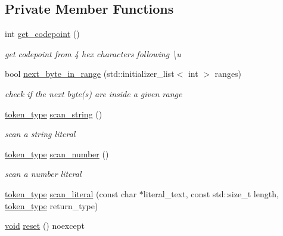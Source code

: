 \subsection*{Private Member Functions}
\begin{DoxyCompactItemize}
\item 
int \hyperlink{classnlohmann_1_1detail_1_1lexer_a820b20e25ff255c3c791c37f2bf48380}{get\+\_\+codepoint} ()
\begin{DoxyCompactList}\small\item\em get codepoint from 4 hex characters following {\ttfamily \textbackslash{}u} \end{DoxyCompactList}\item 
bool \hyperlink{classnlohmann_1_1detail_1_1lexer_a2faa544ab5475523ead81f9cdef41a0a}{next\+\_\+byte\+\_\+in\+\_\+range} (std\+::initializer\+\_\+list$<$ int $>$ ranges)
\begin{DoxyCompactList}\small\item\em check if the next byte(s) are inside a given range \end{DoxyCompactList}\item 
\hyperlink{classnlohmann_1_1detail_1_1lexer_a3f313cdbe187cababfc5e06f0b69b098}{token\+\_\+type} \hyperlink{classnlohmann_1_1detail_1_1lexer_ad271045d1c91df9d6a119482b4aeae7f}{scan\+\_\+string} ()
\begin{DoxyCompactList}\small\item\em scan a string literal \end{DoxyCompactList}\item 
\hyperlink{classnlohmann_1_1detail_1_1lexer_a3f313cdbe187cababfc5e06f0b69b098}{token\+\_\+type} \hyperlink{classnlohmann_1_1detail_1_1lexer_a6bd7e6cdb0380a9df663f1c7f115f34f}{scan\+\_\+number} ()
\begin{DoxyCompactList}\small\item\em scan a number literal \end{DoxyCompactList}\item 
\hyperlink{classnlohmann_1_1detail_1_1lexer_a3f313cdbe187cababfc5e06f0b69b098}{token\+\_\+type} \hyperlink{classnlohmann_1_1detail_1_1lexer_a6f717deb553337736f27cdacccaee536}{scan\+\_\+literal} (const char $\ast$literal\+\_\+text, const std\+::size\+\_\+t length, \hyperlink{classnlohmann_1_1detail_1_1lexer_a3f313cdbe187cababfc5e06f0b69b098}{token\+\_\+type} return\+\_\+type)
\item 
\hyperlink{namespacenlohmann_1_1detail_a59fca69799f6b9e366710cb9043aa77d}{void} \hyperlink{classnlohmann_1_1detail_1_1lexer_acba34bc18af19f93186e682d02c3942d}{reset} () noexcept

\end{DoxyCompactItemize}
